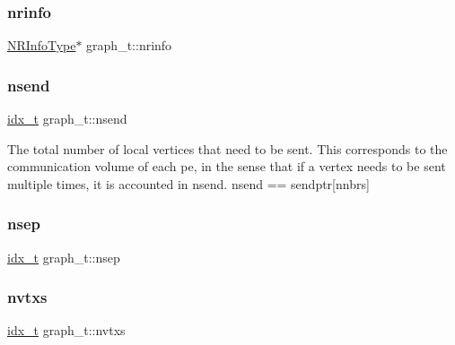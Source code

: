 \mbox{\label{structgraph__t_a2ee093704fdbad45e3108505bbd29594}} 
\subsubsection{\texorpdfstring{nrinfo}{nrinfo}\hspace{0.1cm}{\footnotesize\ttfamily [2/2]}}
{\footnotesize\ttfamily \hyperlink{libparmetis_2struct_8h_a6393d515f02fcdaf17a06297a8db5bbb}{N\+R\+Info\+Type}$\ast$ graph\+\_\+t\+::nrinfo}

\mbox{\label{structgraph__t_ad172a266308975947ef623856df72c87}} 
\subsubsection{\texorpdfstring{nsend}{nsend}}
{\footnotesize\ttfamily \hyperlink{3rd_party_2parmetis-4_80_83_2metis_2include_2metis_8h_aaa5262be3e700770163401acb0150f52}{idx\+\_\+t} graph\+\_\+t\+::nsend}

The total number of local vertices that need to be sent. This corresponds to the communication volume of each pe, in the sense that if a vertex needs to be sent multiple times, it is accounted in nsend. nsend == sendptr\mbox{[}nnbrs\mbox{]} \mbox{\label{structgraph__t_a723e8c2de97704284f492b53c21e9fad}} 
\subsubsection{\texorpdfstring{nsep}{nsep}}
{\footnotesize\ttfamily \hyperlink{3rd_party_2parmetis-4_80_83_2metis_2include_2metis_8h_aaa5262be3e700770163401acb0150f52}{idx\+\_\+t} graph\+\_\+t\+::nsep}

\mbox{\label{structgraph__t_a7e70f7ea557eaa17352b8068c8cb5f03}} 
\subsubsection{\texorpdfstring{nvtxs}{nvtxs}}
{\footnotesize\ttfamily \hyperlink{3rd_party_2parmetis-4_80_83_2metis_2include_2metis_8h_aaa5262be3e700770163401acb0150f52}{idx\+\_\+t} graph\+\_\+t\+::nvtxs}

